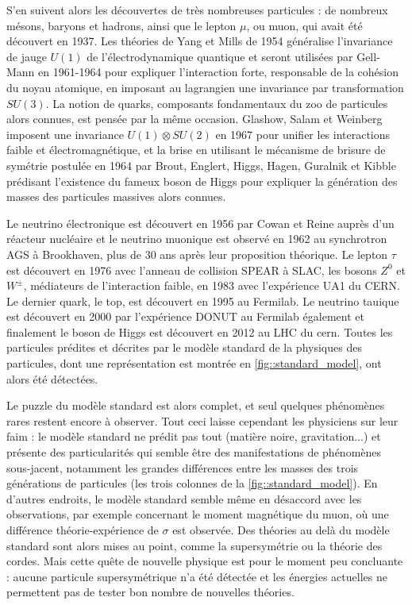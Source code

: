 		    S'en suivent alors les découvertes de très nombreuses particules : de nombreux mésons, baryons et  hadrons, ainsi que le lepton $\mu$, ou muon, qui avait été découvert en 1937\cite{Street1937}. Les théories de Yang et Mills de 1954\cite{Yang1954} généralise l'invariance de jauge $U(1)$ de l'électrodynamique quantique et seront utilisées par Gell-Mann en 1961-1964\cite{Glashow1961,Gell-Mann1964} pour expliquer l'interaction forte, responsable de la cohésion du noyau atomique, en imposant au lagrangien une invariance par transformation $SU(3)$. La notion de quarks, composants fondamentaux du zoo de particules alors connues, est pensée par la même occasion. Glashow, Salam et Weinberg imposent une invariance $U(1)\otimes SU(2)$ en 1967\cite{Glashow1961a,Salam1964,Weinberg1967} pour unifier les interactions faible et électromagnétique, et la brise en utilisant le mécanisme de brisure de symétrie postulée en 1964 par  Brout, Englert, Higgs, Hagen, Guralnik et Kibble\cite{Englert1964,Higgs1964,Higgs1964a,Kibble1967} prédisant l'existence du fameux boson de Higgs pour expliquer la génération des masses des particules massives alors connues. 
		    
		    Le neutrino électronique est découvert en 1956 par Cowan et Reine\cite{Cowan1956} auprès d'un réacteur nucléaire et le neutrino muonique est observé en 1962\cite{Danby1962} au synchrotron AGS à Brookhaven, plus de 30 ans après leur proposition théorique. Le lepton $\tau$ est découvert en 1976\cite{Perl1975} avec l'anneau de collision SPEAR à SLAC, les bosons $Z^0$ et $W^{\pm}$, médiateurs de l'interaction faible, en 1983\cite{Arnison1983,Arnison1983a} avec l'expérience UA1 du CERN. Le dernier quark, le top, est découvert en 1995\cite{Collaboration1995} au Fermilab. Le neutrino tauique est découvert en 2000 par l'expérience DONUT\cite{Collaboration2000} au Fermilab également et finalement le boson de Higgs est découvert en 2012 au LHC du \gls{cern}\cite{Collaboration2012}. Toutes les particules prédites et décrites par le modèle standard de la physiques des particules, dont une représentation est montrée en \autoref{fig::standard_model}, ont alors été détectées. 
		    
		    Le puzzle du modèle standard est alors complet, et seul quelques phénomènes rares restent encore à observer. Tout ceci laisse cependant les physiciens sur leur faim : le modèle standard ne prédit pas tout (matière noire, gravitation...) et présente des particularités qui semble être des manifestations de phénomènes sous-jacent, notamment les grandes différences entre les masses des trois générations de particules (les trois colonnes de la \autoref{fig::standard_model}). En d'autres endroits, le modèle standard semble même en désaccord avec les observations, par exemple concernant le moment magnétique du muon, où une différence théorie-expérience de $\sigma$ est observée\cite{pdg2018}. Des théories au delà du modèle standard sont alors mises au point, comme la supersymétrie ou la théorie des cordes\cite{pdg2018}. Mais cette quête de nouvelle physique est pour le moment peu concluante : aucune particule supersymétrique n'a été détectée et les énergies actuelles ne permettent pas de tester bon nombre de nouvelles théories.
		    
